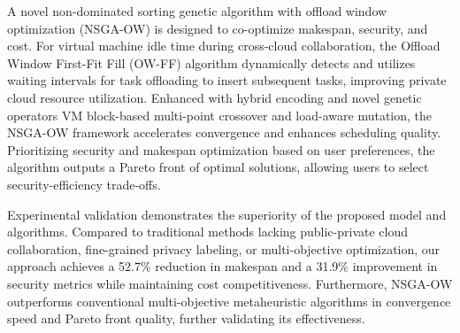 A novel non-dominated sorting genetic algorithm with offload window optimization (NSGA-OW) is designed to co-optimize makespan, security, and cost. For virtual machine idle time during cross-cloud collaboration, the Offload Window First-Fit Fill (OW-FF) algorithm dynamically detects and utilizes waiting intervals for task offloading to insert subsequent tasks, improving private cloud resource utilization. Enhanced with hybrid encoding and novel genetic operators VM block-based multi-point crossover and load-aware mutation, the NSGA-OW framework accelerates convergence and enhances scheduling quality. Prioritizing security and makespan optimization based on user preferences, the algorithm outputs a Pareto front of optimal solutions, allowing users to select security-efficiency trade-offs.

Experimental validation demonstrates the superiority of the proposed model and algorithms. Compared to traditional methods lacking public-private cloud collaboration, fine-grained privacy labeling, or multi-objective optimization, our approach achieves a 52.7\% reduction in makespan and a 31.9\% improvement in security metrics while maintaining cost competitiveness. Furthermore, NSGA-OW outperforms conventional multi-objective metaheuristic algorithms in convergence speed and Pareto front quality, further validating its effectiveness.


